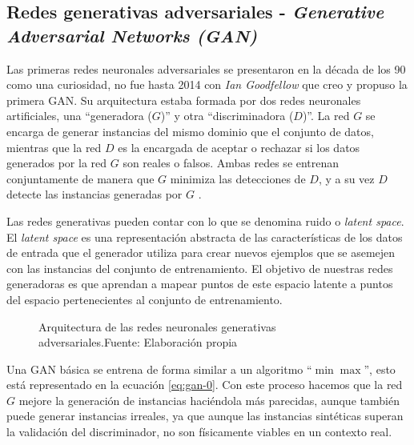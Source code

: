 \subsection{Redes generativas adversariales - \textit{Generative Adversarial Networks (GAN)}}
Las primeras redes neuronales adversariales se presentaron en la década de los 90 como una curiosidad, no fue hasta 2014 con \textit{Ian Goodfellow} que creo y propuso la primera \gls{GAN}. Su arquitectura estaba formada por dos redes neuronales artificiales, una ``generadora (${G}$)'' y otra ``discriminadora (${D}$)''. La red ${G}$ se encarga de generar instancias del mismo dominio que el conjunto de datos, mientras que la red ${D}$ es la encargada de aceptar o rechazar si los datos generados por la red ${G}$ son reales o falsos. Ambas redes se entrenan conjuntamente de manera que ${G}$ minimiza las detecciones de ${D}$, y a su vez ${D}$ detecte las instancias generadas por ${G}$ \cite{de2023redes}.

Las redes generativas pueden contar con lo que se denomina ruido o \textit{latent space}. El \textit{latent space} es una representación abstracta de las características de los datos de entrada que el generador utiliza para crear nuevos ejemplos que se asemejen con las instancias del conjunto de entrenamiento. El objetivo de nuestras redes generadoras es que aprendan a mapear puntos de este espacio latente a puntos del espacio pertenecientes al conjunto de entrenamiento.

\begin{figure}[H]
    \centering
    \centerline{}
    \caption{Arquitectura de las redes neuronales generativas adversariales.\newline{}Fuente: Elaboración propia}
    \label{fig:gans-architecture}
\end{figure}

Una \gls{GAN} básica se entrena de forma similar a un algoritmo ``${\min\max}$'', esto está representado en la ecuación \ref{eq:gan-0}. Con este proceso hacemos que la red ${G}$ mejore la generación de instancias haciéndola más parecidas, aunque también puede generar instancias irreales, ya que aunque las instancias sintéticas superan la validación del discriminador, no son físicamente viables en un contexto real.

